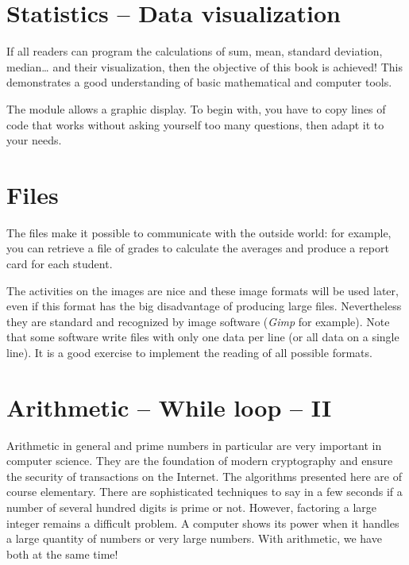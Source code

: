 \documentclass[11pt,class=report,crop=false]{standalone}
\begin{document}
\section{Statistics -- Data visualization}

If all readers can program the calculations of sum, mean, standard deviation, median\ldots{} and their visualization, then the objective of this book is achieved! This demonstrates a good understanding of basic mathematical and computer tools.

The  module allows a graphic display. To begin with, you have to copy lines of code that works without asking yourself too many questions, then adapt it to your needs.


\section{Files}

The files make it possible to communicate \Python{} with the outside world: for example, you can retrieve a file of grades to calculate the averages and produce a report card for each student.

The activities on the images are nice and these image formats will be used later, even if this format has the big disadvantage of producing large files. Nevertheless they are standard and recognized by image software (\emph{Gimp} for example). Note that some software write files with only one data per line (or all data on a single line). It is a good exercise to implement the reading of all possible formats.


\section{Arithmetic -- While loop -- II}

Arithmetic in general and prime numbers in particular are very important in computer science. They are the foundation of modern cryptography and ensure the security of transactions on the Internet.
The algorithms presented here are of course elementary. There are sophisticated techniques to say in a few seconds if a number of several hundred digits is prime or not. However, factoring a large integer remains a difficult problem.
A computer shows its power when it handles a large quantity of numbers or very large numbers. With arithmetic, we have both at the same time!
\end{document}
